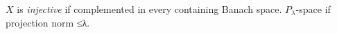 $X$ is \emph{injective} if complemented in every containing Banach space. $P_\lambda$-space if projection norm ≤λ.
